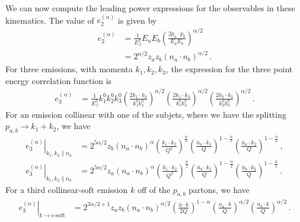 \documentclass[a4paper,11pt]{article}
\newcommand{\ecf}[2]{e_{#1}^{(#2)}}
\newcommand{\nn}{\nonumber}
\begin{document}
We can now compute the leading power expressions for the observables in these kinematics.
The value of $\ecf{2}{\alpha}$ is given by
\begin{align}\label{eq:lp_e2}
\ecf{2}{\alpha}&=\frac{1}{E_J^2} E_a E_b \left( \frac{2p_a\cdot p_b}{E_a E_b}  \right)^{\alpha/2}  \nn \\
&=2^{\alpha/2}  z_az_b\left(n_a\cdot n_b\right)^{\alpha/2}\,.
\end{align}
%
%
For three emissions, with momenta $k_1, k_2, k_3$, the expression for the three point energy correlation function is
\begin{align}
\ecf{3}{\alpha}&=\frac{1}{E_J^3}k_1^0 k_2^0 k_3^0 \left(\frac{2 k_1 \cdot k_2}{k_1^0 k_2^0}  \right)^{\alpha/2}     \left(\frac{2k_1\cdot k_3}{k_1^0 k_3^0}  \right)^{\alpha/2}      \left(\frac{2k_2 \cdot k_3}{k_2^0 k_3^0}  \right)^{\alpha/2}\,.
\end{align}
For an emission collinear with one of the subjets, where we have the splitting $p_{a,b}\rightarrow k_1+k_2$, we have
\begin{align}\label{eq:collinear_limits_eec3}
\left.\ecf{3}{\alpha}\right|_{k_1,k_2\parallel n_a}&=   2^{5\alpha/2}z_b (n_a\cdot n_b)^{\alpha}\left(\frac{k_1\cdot k_2}{Q^2}\right)^{\frac{\alpha}{2}}\left(\frac{\bar n_a\cdot k_1}{Q}\right)^{1-\frac{\alpha}{2}}\left(\frac{\bar n_a\cdot k_2}{Q}\right)^{1-\frac{\alpha}{2}}\,,\\
\left.\ecf{3}{\alpha}\right|_{k_1,k_2\parallel n_b}&= 2^{5\alpha/2}z_a (n_a\cdot n_b)^{\alpha}\left(\frac{k_1\cdot k_2}{Q^2}\right)^{\frac{\alpha}{2}}\left(\frac{\bar n_b\cdot k_1}{Q}\right)^{1-\frac{\alpha}{2}}\left(\frac{\bar n_b\cdot k_2}{Q}\right)^{1-\frac{\alpha}{2}}\,.
\end{align}
%
%
For a third collinear-soft emission $k$ off of the $p_{a,b}$ partons, we have
\begin{align}\label{eq:collinear_soft_limits_eec3}
\left.\ecf{3}{\alpha}\right|_{k\to \text{c-soft}}&=2^{3\alpha/2+1}z_az_b\left(n_a\cdot n_b\right)^{\alpha/2}\left(\frac{\bar{n}\cdot k}{2Q}\right)^{1-\alpha}\left(\frac{n_a\cdot k}{Q}\right)^{\alpha/2}\left(\frac{n_b\cdot k}{Q}\right)^{\alpha/2}\,.
\end{align}
\end{document}
